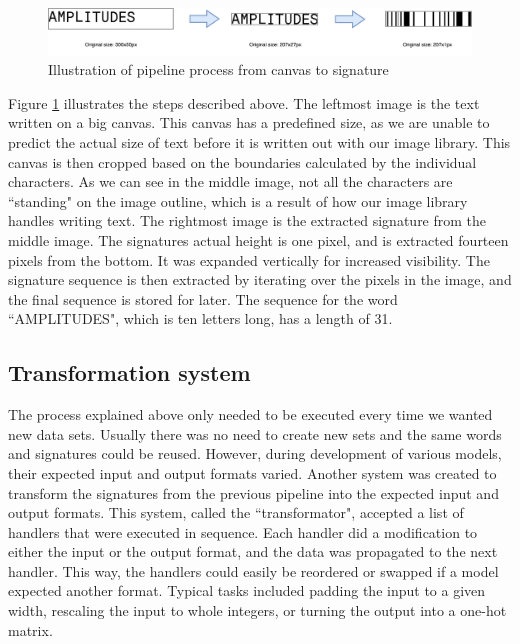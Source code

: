 \begin{figure}[H]
    \centering
    \includegraphics[width=1\textwidth]{fig/development_process/pipeline.pdf}
    \caption{Illustration of pipeline process from canvas to signature}
    \label{fig:development-pipeline}
\end{figure}

Figure \ref{fig:development-pipeline} illustrates the steps described above. The leftmost image is the text written on a big canvas. This canvas has a predefined size, as we are unable to predict the actual size of text before it is written out with our image library. This canvas is then cropped based on the boundaries calculated by the individual characters. As we can see in the middle image, not all the characters are ``standing" on the image outline, which is a result of how our image library handles writing text. The rightmost image is the extracted signature from the middle image. The signatures actual height is one pixel, and is extracted fourteen pixels from the bottom. It was expanded vertically for increased visibility. The signature sequence is then extracted by iterating over the pixels in the image, and the final sequence is stored for later. The sequence for the word ``AMPLITUDES", which is ten letters long, has a length of 31.

\subsection{Transformation system}
The process explained above only needed to be executed every time we wanted new data sets. Usually there was no need to create new sets and the same words and signatures could be reused. However, during development of various models, their expected input and output formats varied. Another system was created to transform the signatures from the previous pipeline into the expected input and output formats. This system, called the ``transformator", accepted a list of handlers that were executed in sequence. Each handler did a modification to either the input or the output format, and the data was propagated to the next handler. This way, the handlers could easily be reordered or swapped if a model expected another format. Typical tasks included padding the input to a given width, rescaling the input to whole integers, or turning the output into a one-hot matrix.

